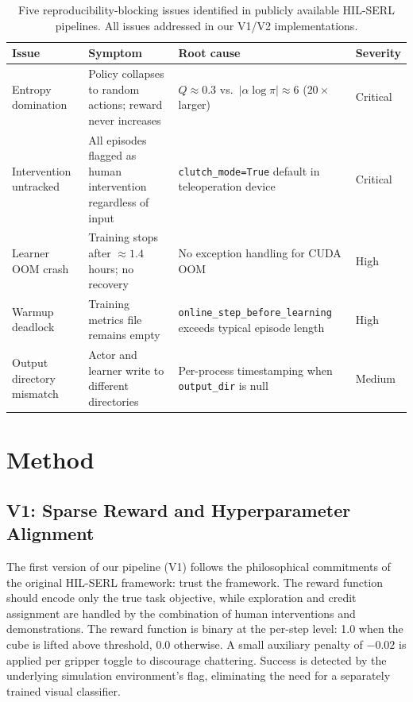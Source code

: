 \documentclass[12pt,a4paper]{article}
\begin{document}
\begin{table}[t]
\centering
\caption{Five reproducibility-blocking issues identified in publicly available HIL-SERL pipelines. All issues addressed in our V1/V2 implementations.}
\label{tab:bugs}
\small
\begin{tabular}{lp{4.0cm}p{4.5cm}l}
\toprule
\textbf{Issue} & \textbf{Symptom} & \textbf{Root cause} & \textbf{Severity} \\
\midrule
Entropy domination & Policy collapses to random actions; reward never increases & $Q \approx 0.3$ vs.\ $|\alpha \log \pi| \approx 6$ ($20\times$ larger) & Critical \\
\addlinespace
Intervention untracked & All episodes flagged as human intervention regardless of input & \texttt{clutch\_mode=True} default in teleoperation device & Critical \\
\addlinespace
Learner OOM crash & Training stops after $\approx 1.4$ hours; no recovery & No exception handling for CUDA OOM & High \\
\addlinespace
Warmup deadlock & Training metrics file remains empty & \texttt{online\_step\_before\_learning} exceeds typical episode length & High \\
\addlinespace
Output directory mismatch & Actor and learner write to different directories & Per-process timestamping when \texttt{output\_dir} is null & Medium \\
\bottomrule
\end{tabular}
\end{table}

\section{Method} \label{sec:method}

\subsection{V1: Sparse Reward and Hyperparameter Alignment}

The first version of our pipeline (V1) follows the philosophical commitments of the original HIL-SERL framework: trust the framework. The reward function should encode only the true task objective, while exploration and credit assignment are handled by the combination of human interventions and demonstrations. The reward function is binary at the per-step level: 1.0 when the cube is lifted above threshold, 0.0 otherwise. A small auxiliary penalty of $-0.02$ is applied per gripper toggle to discourage chattering. Success is detected by the underlying simulation environment's flag, eliminating the need for a separately trained visual classifier.
\end{document}
